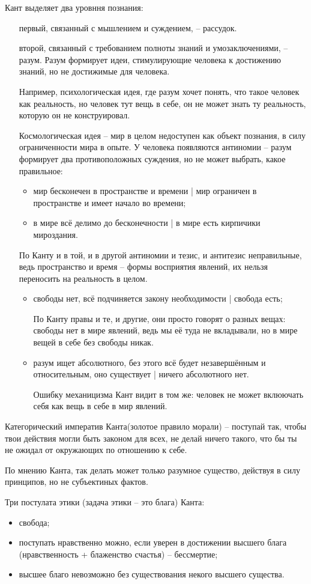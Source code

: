\documentclass[a4paper, 12pt]{book} %
\begin{document}
Кант выделяет два уровння познания:
\begin{itemize}
\item[первый,] связанный с мышлением и суждением, -- рассудок.
\item[второй,] связанный с требованием полноты знаний и умозаключениями, -- разум. Разум формирует идеи, стимулирующие человека к достижению знаний, но не достижимые для человека.

Например, психологическая идея, где разум хочет понять, что такое человек как реальность, но человек тут вещь в себе, он не может знать ту реальность, которую он не конструировал.

Космологическая идея -- мир в целом недоступен как объект познания, в силу ограниченности мира в опыте. У человека появляются антиномии -- разум формирует два противоположных суждения, но не может выбрать, какое правильное:
\begin{itemize}
\item мир бесконечен в пространстве и времени | мир ограничен в пространстве и имеет начало во времени;
\item в мире всё делимо до бесконечности | в мире есть кирпичики мироздания.
\end{itemize} 
По Канту и в той, и в другой антиномии и тезис, и антитезис неправильные, ведь пространство и время -- формы восприятия явлений, их нельзя переносить на реальность в целом.
\begin{itemize}
\item свободы нет, всё подчиняется закону необходимости | свобода есть;

По Канту правы и те, и другие, они просто говорят о разных вещах: свободы нет в мире явлений, ведь мы её туда не вкладывали, но в мире вещей в себе без свободы никак.

\item разум ищет абсолютного, без этого всё будет незавершённым и относительным, оно существует | ничего абсолютного нет.

Ошибку механицизма Кант видит в том же: человек не может вклюючать себя как вещь в себе в мир явлений. 
\end{itemize}
\end{itemize}

Категорический императив Канта(золотое правило морали) -- поступай так, чтобы твои действия могли быть законом для всех, не делай ничего такого, что бы ты не ожидал от окружающих по отношению к себе.

По мнению Канта, так делать может только разумное существо, действуя в силу принципов, но не субъектиных фактов.


Три постулата этики (задача этики -- это блага) Канта:
\begin{itemize}
\item свобода;
\item поступать нравственно можно, если уверен в достижении высшего блага (нравственность + блаженство счастья) -- бессмертие;
\item высшее благо невозможно без существования некого высшего существа.
\end{itemize}
\end{document}
